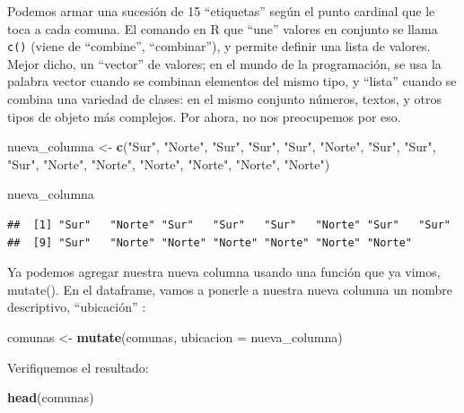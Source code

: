 \documentclass[spanish,]{book}
\newenvironment{Shaded}{\begin{snugshade}}{\end{snugshade}}
\newcommand{\DataTypeTok}[1]{\textcolor[rgb]{0.13,0.29,0.53}{#1}}
\newcommand{\KeywordTok}[1]{\textcolor[rgb]{0.13,0.29,0.53}{\textbf{#1}}}
\newcommand{\NormalTok}[1]{#1}
\newcommand{\StringTok}[1]{\textcolor[rgb]{0.31,0.60,0.02}{#1}}
\begin{document}
Podemos armar una sucesión de 15 ``etiquetas'' según el punto cardinal que le toca a cada comuna. El comando en R que ``une'' valores en conjunto se llama \texttt{c()} (viene de ``combine'', ``combinar''), y permite definir una lista de valores. Mejor dicho, un ``vector'' de valores; en el mundo de la programación, se usa la palabra vector cuando se combinan elementos del mismo tipo, y ``lista'' cuando se combina una variedad de clases: en el mismo conjunto números, textos, y otros tipos de objeto más complejos. Por ahora, no nos preocupemos por eso.

\begin{Shaded}
\begin{Highlighting}[]
\NormalTok{nueva_columna <-}\StringTok{ }\KeywordTok{c}\NormalTok{(}\StringTok{"Sur"}\NormalTok{, }\StringTok{"Norte"}\NormalTok{, }\StringTok{"Sur"}\NormalTok{, }\StringTok{"Sur"}\NormalTok{, }\StringTok{"Sur"}\NormalTok{, }\StringTok{"Norte"}\NormalTok{, }\StringTok{"Sur"}\NormalTok{, }\StringTok{"Sur"}\NormalTok{, }\StringTok{"Sur"}\NormalTok{, }\StringTok{"Norte"}\NormalTok{, }\StringTok{"Norte"}\NormalTok{, }\StringTok{"Norte"}\NormalTok{, }\StringTok{"Norte"}\NormalTok{, }\StringTok{"Norte"}\NormalTok{, }\StringTok{"Norte"}\NormalTok{)}

\NormalTok{nueva_columna}
\end{Highlighting}
\end{Shaded}

\begin{verbatim}
##  [1] "Sur"   "Norte" "Sur"   "Sur"   "Sur"   "Norte" "Sur"   "Sur"  
##  [9] "Sur"   "Norte" "Norte" "Norte" "Norte" "Norte" "Norte"
\end{verbatim}

Ya podemos agregar nuestra nueva columna usando una función que ya vimos, mutate(). En el dataframe, vamos a ponerle a nuestra nueva columna un nombre descriptivo, ``ubicación'' :

\begin{Shaded}
\begin{Highlighting}[]
\NormalTok{comunas <-}\StringTok{ }\KeywordTok{mutate}\NormalTok{(comunas, }\DataTypeTok{ubicacion =}\NormalTok{ nueva_columna)}
\end{Highlighting}
\end{Shaded}

Verifiquemos el resultado:

\begin{Shaded}
\begin{Highlighting}[]
\KeywordTok{head}\NormalTok{(comunas)}
\end{Highlighting}
\end{Shaded}
\end{document}
